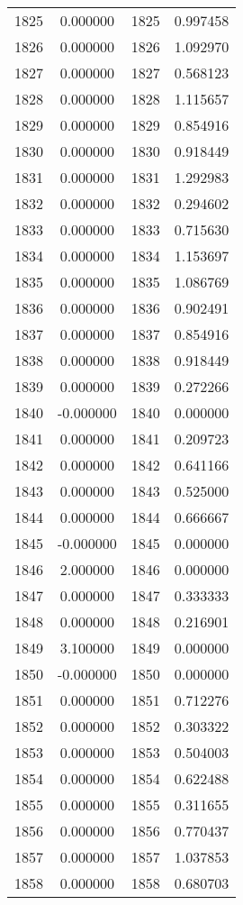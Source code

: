 \documentclass[12pt]{article}
\begin{document}
\begin{longtable}{@{}cccc@{}}
1825 & 0.000000 & 1825 & 0.997458 \\
1826 & 0.000000 & 1826 & 1.092970 \\
1827 & 0.000000 & 1827 & 0.568123 \\
1828 & 0.000000 & 1828 & 1.115657 \\
1829 & 0.000000 & 1829 & 0.854916 \\
1830 & 0.000000 & 1830 & 0.918449 \\
1831 & 0.000000 & 1831 & 1.292983 \\
1832 & 0.000000 & 1832 & 0.294602 \\
1833 & 0.000000 & 1833 & 0.715630 \\
1834 & 0.000000 & 1834 & 1.153697 \\
1835 & 0.000000 & 1835 & 1.086769 \\
1836 & 0.000000 & 1836 & 0.902491 \\
1837 & 0.000000 & 1837 & 0.854916 \\
1838 & 0.000000 & 1838 & 0.918449 \\
1839 & 0.000000 & 1839 & 0.272266 \\
1840 & -0.000000 & 1840 & 0.000000 \\
1841 & 0.000000 & 1841 & 0.209723 \\
1842 & 0.000000 & 1842 & 0.641166 \\
1843 & 0.000000 & 1843 & 0.525000 \\
1844 & 0.000000 & 1844 & 0.666667 \\
1845 & -0.000000 & 1845 & 0.000000 \\
1846 & 2.000000 & 1846 & 0.000000 \\
1847 & 0.000000 & 1847 & 0.333333 \\
1848 & 0.000000 & 1848 & 0.216901 \\
1849 & 3.100000 & 1849 & 0.000000 \\
1850 & -0.000000 & 1850 & 0.000000 \\
1851 & 0.000000 & 1851 & 0.712276 \\
1852 & 0.000000 & 1852 & 0.303322 \\
1853 & 0.000000 & 1853 & 0.504003 \\
1854 & 0.000000 & 1854 & 0.622488 \\
1855 & 0.000000 & 1855 & 0.311655 \\
1856 & 0.000000 & 1856 & 0.770437 \\
1857 & 0.000000 & 1857 & 1.037853 \\
1858 & 0.000000 & 1858 & 0.680703 \\

\end{longtable}
\end{document}
